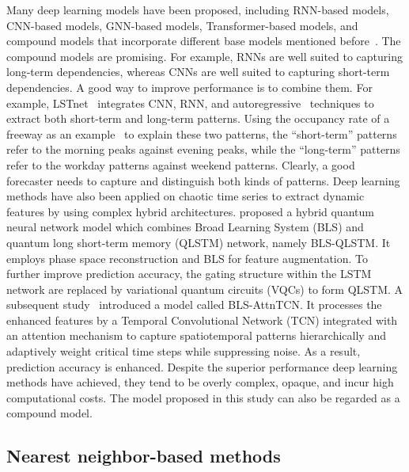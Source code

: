 Many deep learning models have been proposed, including RNN-based models, CNN-based models, GNN-based models, Transformer-based models, and compound models that incorporate different base models mentioned before~\cite{chen2023long}.
%
The compound models are promising.
For example, RNNs are well suited to capturing long-term dependencies, whereas CNNs are well suited to capturing short-term dependencies. 
A good way to improve performance is to combine them.
For example, LSTnet~\cite{lai2018modeling} integrates CNN, RNN, and autoregressive~\cite{yule1927method} techniques to extract both short-term and long-term patterns.
Using the occupancy rate of a freeway as an example~\cite{lai2018modeling} to explain these two patterns, the ``short-term'' patterns refer to the morning peaks against evening peaks, while the ``long-term'' patterns refer to the workday patterns against weekend patterns.
Clearly, a good forecaster needs to capture and distinguish both kinds of patterns.
%
Deep learning methods have also been applied on chaotic time series to extract dynamic features by using complex hybrid architectures.
\cite{su2025blsqlstm} proposed a hybrid quantum neural network model which combines Broad Learning System (BLS) and quantum long short-term memory (QLSTM) network, namely BLS-QLSTM.
It employs phase space reconstruction and BLS for feature augmentation.
To further improve prediction accuracy, the gating structure within the LSTM network are replaced by variational quantum circuits (VQCs) to form QLSTM.
%
A subsequent study~\cite{su2026blsattntcn} introduced a model called BLS-AttnTCN.
It processes the enhanced features by a Temporal Convolutional Network (TCN) integrated with an attention mechanism to capture spatiotemporal patterns hierarchically and adaptively weight critical time steps while suppressing noise.
As a result, prediction accuracy is enhanced.
%
Despite the superior performance deep learning methods have achieved, they tend to be overly complex, opaque, and incur high computational costs.
The model proposed in this study can also be regarded as a compound model.

\subsection{Nearest neighbor-based methods} %

